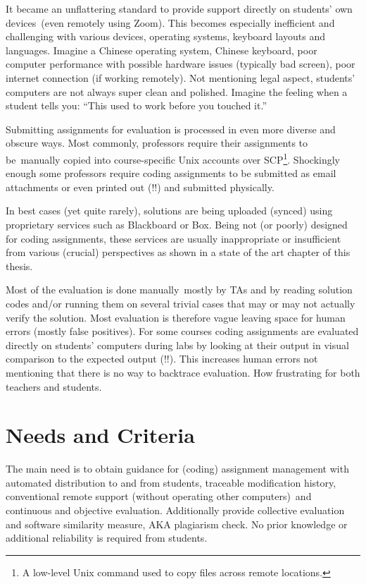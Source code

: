{It became an unflattering standard to }{provide support directly on students' own devices}{~(even remotely using Zoom). This becomes especially inefficient and challenging with various devices, operating systems, keyboard layouts and languages. Imagine a Chinese operating system, Chinese keyboard, poor computer performance with possible hardware issues (typically bad screen), poor internet connection (if working remotely). Not mentioning legal aspect, students' computers are not always super clean and polished. Imagine the feeling when a student tells you: ``This used to work before you touched it.''}

{Submitting assignments for evaluation is processed in even more diverse and obscure ways. Most commonly, professors require their assignments to be}{~manually copied into course-specific Unix accounts over SCP}\footnote{A low-level Unix command used to copy files across remote locations.}{. Shockingly enough some professors require coding assignments to be submitted as email attachments or even printed out (!!) and submitted physically.}

{In best cases (yet quite rarely), solutions are being uploaded (synced) using proprietary services such as Blackboard or Box. Being not (or poorly) designed for coding assignments, these services are }{usually inappropriate or insufficient from various (crucial) perspectives as shown in a state of the art chapter of this thesis.}

{Most of the }{evaluation is done manually}{~mostly by TAs and by reading solution codes and/or running them on several trivial cases that may or may not actually verify the solution. Most evaluation is therefore vague leaving space for human errors (mostly false positives). For some courses coding assignments are evaluated directly on students' computers during labs by looking at their output in visual comparison to the expected output (!!). This increases human errors not mentioning that there is }{no way to backtrace evaluation}{. How frustrating for both teachers and students.}

\section{Needs and Criteria} \label{sec:criteria}

{The main need is to obtain guidance for (coding) assignment management with automated distribution to and from students, traceable modification history, conventional }{remote support (without operating other computers)}{~and continuous and objective evaluation. Additionally provide collective evaluation and software similarity measure, AKA plagiarism check. No prior knowledge or additional reliability is required from students.}

